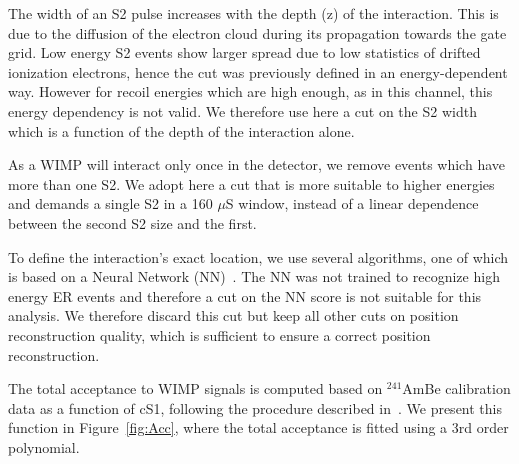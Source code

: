 The width of an S2 pulse increases with the depth (z) of the interaction. This is due to the diffusion of the electron cloud during its propagation
towards the gate grid. Low energy S2 events show larger spread
due to low statistics of drifted ionization electrons, hence
the cut was previously defined in an energy-dependent way. However for recoil energies which are high enough, as in this channel, this energy dependency is not valid. We therefore use here a cut on the S2 width which is a function of the depth of the interaction alone. 

As a WIMP will interact only once in the detector, we remove events which have more than one S2. We adopt here a cut that is more suitable to higher energies and demands a single S2 in a 160 $\mu$S window, instead of a linear dependence between the second S2 size and the first. 

To define the interaction's exact location, we use several algorithms, one of which is based on a Neural Network (NN)~\cite{Aprile:2012vw}. The NN was not trained to recognize high energy ER events and therefore a cut on the NN score is not suitable for this analysis. We therefore discard this cut but keep all other cuts on position reconstruction quality, which is sufficient to ensure a correct position reconstruction. 

The total acceptance to WIMP signals is computed based on $^{241}$AmBe calibration data as a function of cS1, following the procedure described in~\cite{Aprile:2012vw}. We present this function in Figure~\ref{fig:Acc}, where the total acceptance is fitted using a 3rd order polynomial.

